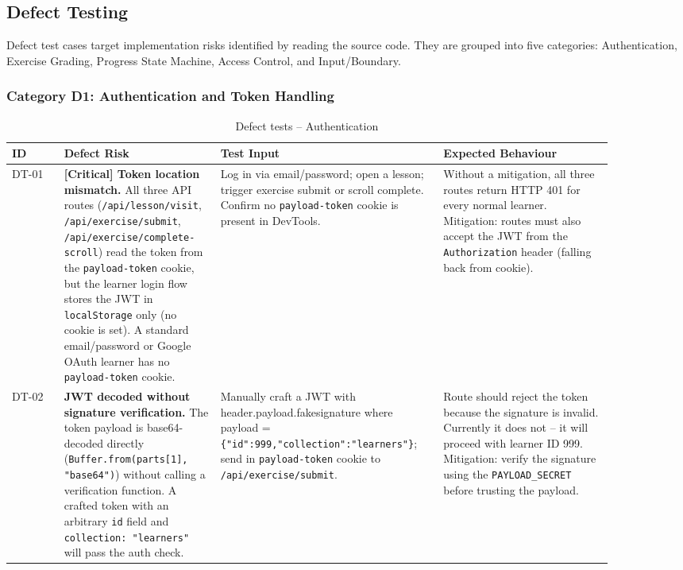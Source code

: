 \subsection{Defect Testing}
\label{sec:defect}

Defect test cases target implementation risks identified by reading the source code. They are grouped into five categories: Authentication, Exercise Grading, Progress State Machine, Access Control, and Input/Boundary.

\subsubsection{Category D1: Authentication and Token Handling}

\begin{longtable}{p{0.08\linewidth} p{0.24\linewidth} p{0.30\linewidth} p{0.26\linewidth}}
\caption{Defect tests -- Authentication}\\
\toprule
ID & Defect Risk & Test Input & Expected Behaviour \\
\midrule
\endhead
DT-01 & \textbf{[Critical] Token location mismatch.} All three API routes (\texttt{/api/lesson/visit}, \texttt{/api/exercise/submit}, \texttt{/api/exercise/complete-scroll}) read the token from the \texttt{payload-token} cookie, but the learner login flow stores the JWT in \texttt{localStorage} only (no cookie is set). A standard email/password or Google OAuth learner has no \texttt{payload-token} cookie. & Log in via email/password; open a lesson; trigger exercise submit or scroll complete. Confirm no \texttt{payload-token} cookie is present in DevTools. & Without a mitigation, all three routes return HTTP 401 for every normal learner. Mitigation: routes must also accept the JWT from the \texttt{Authorization} header (falling back from cookie). \\
DT-02 & \textbf{JWT decoded without signature verification.} The token payload is base64-decoded directly (\texttt{Buffer.from(parts[1], "base64")}) without calling a verification function. A crafted token with an arbitrary \texttt{id} field and \texttt{collection: "learners"} will pass the auth check. & Manually craft a JWT with header.payload.fakesignature where payload = \texttt{\{"id":999,"collection":"learners"\}}; send in \texttt{payload-token} cookie to \texttt{/api/exercise/submit}. & Route should reject the token because the signature is invalid. Currently it does not -- it will proceed with learner ID 999. Mitigation: verify the signature using the \texttt{PAYLOAD\_SECRET} before trusting the payload. \\

\end{longtable}
